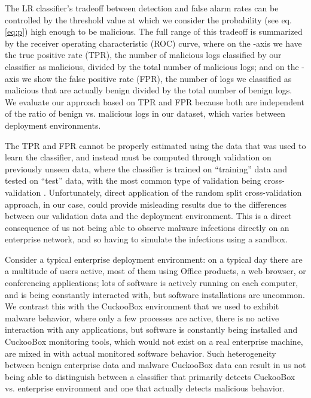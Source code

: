 \documentclass{sig-alternate-2013}
\begin{document}
The LR classifier's tradeoff between detection and false alarm rates can be controlled by the threshold value at which we consider the probability  (see eq. \eqref{eq:p}) high enough to be malicious. The full range of this tradeoff is summarized by the receiver operating characteristic (ROC) curve, where on the -axis we have the true positive rate (TPR), the number of malicious logs classified by our classifier as malicious, divided by the total number of malicious logs; and on the -axis we show the false positive rate (FPR), the number of logs we classified as malicious that are actually benign divided by the total number of benign logs. We evaluate our approach based on TPR and FPR because both are independent of the ratio of benign vs. malicious logs in our dataset, which varies between deployment environments.

The TPR and FPR cannot be properly estimated using the data that was used to learn the classifier, and instead must be computed through validation on previously unseen data, where the classifier is trained on ``training'' data and tested on ``test'' data, with the most common type of validation being cross-validation \cite{shalev2014understanding}. Unfortunately, direct application of the random split cross-validation approach, in our case, could provide misleading results due to the differences between our validation data and the deployment environment. This is a direct consequence of us not being able to observe malware infections directly on an enterprise network, and so having to simulate the infections using a sandbox. 

Consider a typical enterprise deployment environment: on a typical day there are a multitude of users active, most of them using Office products, a web browser, or conferencing applications; lots of software is actively running on each computer, and is being constantly interacted with, but software installations are uncommon. We contrast this with the CuckooBox environment that we used to exhibit malware behavior, where only a few processes are active, there is no active interaction with any applications, but software is constantly being installed and CuckooBox monitoring tools, which would not exist on a real enterprise machine, are mixed in with actual monitored software behavior. Such heterogeneity between benign enterprise data and malware CuckooBox data can result in us not being able to distinguish between a classifier that primarily detects CuckooBox vs. enterprise environment and one that actually detects malicious behavior.
\end{document}

